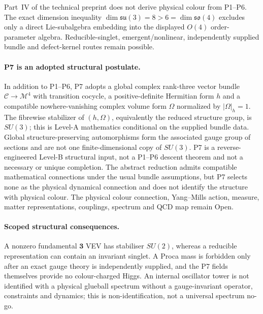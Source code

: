 \documentclass[11pt,a4paper]{article}
\begin{document}
Part~IV of the technical preprint does not derive physical colour from
P1--P6.  The exact dimension inequality
$\dim\mathfrak{su}(3)=8>6=\dim\mathfrak{so}(4)$ excludes only a direct
Lie-subalgebra embedding into the displayed $O(4)$ order-parameter algebra.
Reducible-singlet, emergent/nonlinear, independently supplied bundle and
defect-kernel routes remain possible.

\paragraph{P7 is an adopted structural postulate.}
In addition to P1--P6, P7 adopts a global complex rank-three vector bundle
$\mathcal C\to\mathcal M^4$ with transition cocycle, a positive-definite
Hermitian form $h$ and a compatible nowhere-vanishing complex volume form
$\Omega$ normalized by $|\Omega|_h=1$.  The fibrewise stabilizer of
$(h,\Omega)$, equivalently the reduced structure group, is $SU(3)$; this is
Level-A mathematics conditional on the supplied bundle data.  Global
structure-preserving automorphisms form the associated gauge group of sections
and are not one finite-dimensional copy of $SU(3)$.  P7 is a reverse-engineered
Level-B structural input, not a P1--P6 descent theorem and not a necessary or
unique completion.  The abstract reduction admits compatible mathematical
connections under the usual bundle assumptions, but P7 selects none as the
physical dynamical connection and does not identify the structure with
physical colour.  The physical colour connection, Yang--Mills action, measure,
matter representations, couplings, spectrum and QCD map remain Open.

\paragraph{Scoped structural consequences.}
A nonzero fundamental $\mathbf3$ VEV has stabiliser $SU(2)$, whereas a
reducible representation can contain an invariant singlet.  A Proca mass is
forbidden only after an exact gauge theory is independently supplied, and
the P7 fields themselves provide no colour-charged Higgs.  An internal
oscillator tower is not identified with a physical glueball spectrum without
a gauge-invariant operator, constraints and dynamics; this is
non-identification, not a universal spectrum no-go.
\end{document}
